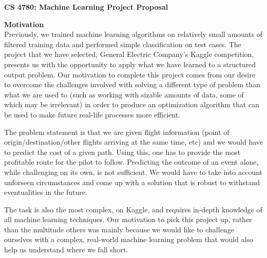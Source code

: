 \documentclass{article}[9pt]
\begin{document}
\begin{framed}
\noindent
\large{\textbf{CS 4780: Machine Learning \hfill Project Proposal}}
\end{framed}

\noindent\Large{\textbf{Motivation}}\\
\noindent Previously, we trained machine learning algorithms on relatively small amounts of filtered training data and performed simple classification on test cases. The project that we have selected, General Electric Company's Kaggle competition, presents us with the opportunity to apply what we have learned to a structured output problem. Our motivation to complete this project comes from our desire to overcome the challenges involved with solving a different type of problem than what we are used to (such as working with sizable amounts of data, some of which may be irrelevant) in order to produce an optimization algorithm that can be used to make future real-life processes more efficient.

The problem statement is that we are given flight information (point of origin/destination/other flights arriving at the same time, etc) and we would have to predict the cost of a given path. Using this, one has to provide the most profitable route for the pilot to follow. Predicting the outcome of an event alone, while challenging on its own, is not sufficient. We would have to take into account unforseen circumstances and come up with a solution that is robust to withstand eventualities in the future.

The task is also the most complex, on Kaggle, and requires in-depth knowledge of all machine learning techniques. Our motivation to pick this project up, rather than the multitude others was mainly because we would like to challenge ourselves with a complex, real-world machine learning problem that would also help us understand where we fall short.
\end{document}
